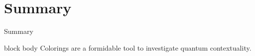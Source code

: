 \documentclass{beamer}
\begin{document}
\section{Summary}
\begin{frame}{Summary}
    \begin{beamercolorbox}[sep=2em,center]{block body}
        \huge\alert{Colorings are a formidable tool to investigate quantum contextuality.}
    \end{beamercolorbox}
\end{frame}
\end{document}
